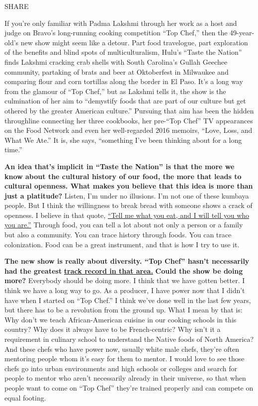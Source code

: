 SHARE

If you're only familiar with Padma Lakshmi through her work as a host
and judge on Bravo's long-running cooking competition ``Top Chef,'' then
the 49-year-old's new show might seem like a detour. Part food
travelogue, part exploration of the benefits and blind spots of
multiculturalism, Hulu's ``Taste the Nation'' finds Lakshmi cracking
crab shells with South Carolina's Gullah Geechee community, partaking of
brats and beer at Oktoberfest in Milwaukee and comparing flour and corn
tortillas along the border in El Paso. It's a long way from the glamour
of ``Top Chef,'' but as Lakshmi tells it, the show is the culmination of
her aim to ``demystify foods that are part of our culture but get
othered by the greater American culture.'' Pursuing that aim has been
the hidden throughline connecting her three cookbooks, her pre-``Top
Chef'' TV appearances on the Food Network and even her well-regarded
2016 memoirs, ``Love, Loss, and What We Ate.'' It is, she says,
``something I've been thinking about for a long time.''

\textbf{An idea that's implicit in ``Taste the Nation'' is that the more
we know about the cultural history of our food, the more that leads to
cultural openness. What makes you believe that this idea is more than
just a platitude?} Listen, I'm under no illusions. I'm not one of these
kumbaya people. But I think the willingness to break bread with someone
shows a crack of openness. I believe in that quote,
\href{http://nytimes3xbfgragh.onion\#tooltip-1}{``Tell me what you eat,
and I will tell you who you are.''} Through food, you can tell a lot
about not only a person or a family but also a community. You can trace
history through foods. You can trace colonization. Food can be a great
instrument, and that is how I try to use it.

\textbf{The new show is really about diversity. ``Top Chef'' hasn't
necessarily had the greatest}
\textbf{\href{http://nytimes3xbfgragh.onion\#tooltip-2}{track record in
that area.}} \textbf{Could the show be doing more?} Everybody should be
doing more. I think that we have gotten better. I think we have a long
way to go. As a producer, I have power now that I didn't have when I
started on ``Top Chef.'' I think we've done well in the last few years,
but there has to be a revolution from the ground up. What I mean by that
is: Why don't we teach African-American cuisine in our cooking schools
in this country? Why does it always have to be French-centric? Why isn't
it a requirement in culinary school to understand the Native foods of
North America? And these chefs who have power now, usually white male
chefs, they're often mentoring people whom it's easy for them to mentor.
I would love to see those chefs go into urban environments and high
schools or colleges and search for people to mentor who aren't
necessarily already in their universe, so that when people want to come
on ``Top Chef'' they're trained properly and can compete on equal
footing.

